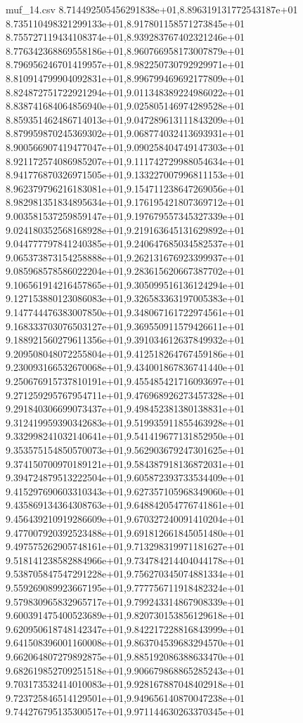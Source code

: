 \begin{filecontents*}{muf_14.csv}
8.714492505456291838e+01,8.896319131772543187e+01
8.735110498321299133e+01,8.917801158571273845e+01
8.755727119434108374e+01,8.939283767402321246e+01
8.776342368869558186e+01,8.960766958173007879e+01
8.796956246701419957e+01,8.982250730792929971e+01
8.810914799904092831e+01,8.996799469692177809e+01
8.824872751722921294e+01,9.011348389224986022e+01
8.838741684064856940e+01,9.025805146974289528e+01
8.859351462486714013e+01,9.047289613111843209e+01
8.879959870245369302e+01,9.068774032413693931e+01
8.900566907419477047e+01,9.090258404749147303e+01
8.921172574086985207e+01,9.111742729988054634e+01
8.941776870326971505e+01,9.133227007996811153e+01
8.962379796216183081e+01,9.154711238647269056e+01
8.982981351834895634e+01,9.176195421807369712e+01
9.003581537259859147e+01,9.197679557345327339e+01
9.024180352568168928e+01,9.219163645131629892e+01
9.044777797841240385e+01,9.240647685034582537e+01
9.065373873154258888e+01,9.262131676923399937e+01
9.085968578586022204e+01,9.283615620667387702e+01
9.106561914216457865e+01,9.305099516136124294e+01
9.127153880123086083e+01,9.326583363197005383e+01
9.147744476383007850e+01,9.348067161722974561e+01
9.168333703076503127e+01,9.369550911579426611e+01
9.188921560279611356e+01,9.391034612637849932e+01
9.209508048072255804e+01,9.412518264767459186e+01
9.230093166532670068e+01,9.434001867836741440e+01
9.250676915737810191e+01,9.455485421716093697e+01
9.271259295767954711e+01,9.476968926273457328e+01
9.291840306699073437e+01,9.498452381380138831e+01
9.312419959390342683e+01,9.519935911855463928e+01
9.332998241032140641e+01,9.541419677131852950e+01
9.353575154850570073e+01,9.562903679247301625e+01
9.374150700970189121e+01,9.584387918136872031e+01
9.394724879513222504e+01,9.605872393733534409e+01
9.415297690603310343e+01,9.627357105968349060e+01
9.435869134364308763e+01,9.648842054776741861e+01
9.456439210919286609e+01,9.670327240091410204e+01
9.477007920392523488e+01,9.691812661845051480e+01
9.497575262905748161e+01,9.713298319971181627e+01
9.518141238582884966e+01,9.734784214404044178e+01
9.538705847547291228e+01,9.756270345074881334e+01
9.559269089923667195e+01,9.777756711918482324e+01
9.579830965832965717e+01,9.799243314867908339e+01
9.600391475400523689e+01,9.820730153856129618e+01
9.620950618748142347e+01,9.842217228816843999e+01
9.641508396001160008e+01,9.863704539683294570e+01
9.662064807279892875e+01,9.885192086388633470e+01
9.682619852709251518e+01,9.906679868865285243e+01
9.703173532414010083e+01,9.928167887048402918e+01
9.723725846514129501e+01,9.949656140870047238e+01
9.744276795135300517e+01,9.971144630263370345e+01

\end{filecontents*}
